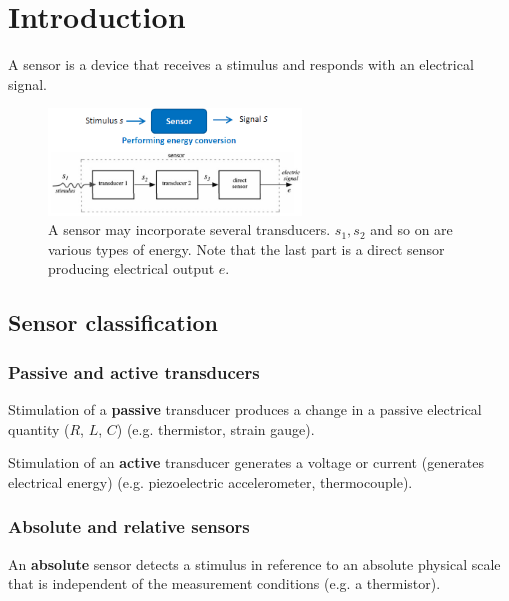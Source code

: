 \section{Introduction}

\begin{mydef}
A sensor is a device that receives a stimulus
and responds with an electrical signal.
\end{mydef}

\begin{figure}[H]
    \centering
    \includegraphics[width = 0.6\textwidth]{L1/img/sensor-def.PNG}
    \caption{A sensor may incorporate several transducers. $s_1, s_2$ and so on are various types of energy. Note that the last part is a direct sensor producing electrical output $e$.}
    \label{fig:sensor-def}
\end{figure}

\subsection{Sensor classification}

\subsubsection{Passive and active transducers}

\begin{mydef}
Stimulation of a \textbf{passive} transducer produces a
change in a passive electrical quantity ($R$, $L$, $C$) (e.g. thermistor, strain gauge).
\end{mydef}

\begin{mydef}
Stimulation of an \textbf{active} transducer generates a
voltage or current (generates electrical energy) (e.g. piezoelectric accelerometer, thermocouple).
\end{mydef}

\subsubsection{Absolute and relative sensors}

\begin{mydef}
An \textbf{absolute} sensor detects a stimulus in reference
to an absolute physical scale that is independent
of the measurement conditions (e.g. a thermistor).
\end{mydef}

